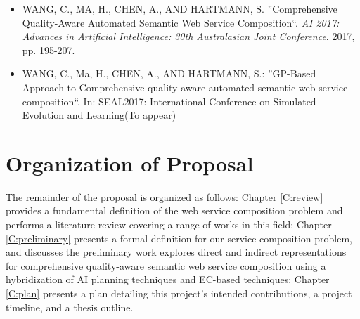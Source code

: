 \begin{itemize}
 \item WANG, C., MA, H., CHEN, A., AND HARTMANN, S. ''Comprehensive Quality-Aware Automated Semantic Web Service Composition``. \textit{AI 2017: Advances in Artificial Intelligence: 30th Australasian Joint Conference}. 2017, pp. 195-207.
 \item WANG, C., Ma, H., CHEN, A., AND HARTMANN, S.: ''GP-Based Approach to Comprehensive quality-aware automated semantic web service composition``. In: SEAL2017: International Conference on Simulated Evolution and Learning(To appear)
\end{itemize}


\section{Organization of Proposal}The remainder of the proposal is organized as follows: Chapter \ref{C:review} provides a fundamental definition of the web service composition problem and performs a literature review covering a range of works in this field; Chapter \ref{C:preliminary} presents a formal definition for our service composition problem, and discusses the preliminary work explores direct and indirect representations for comprehensive quality-aware semantic web service composition using a hybridization of AI planning techniques and EC-based techniques; Chapter \ref{C:plan} presents a plan detailing this project's intended contributions, a project timeline, and a thesis outline.
